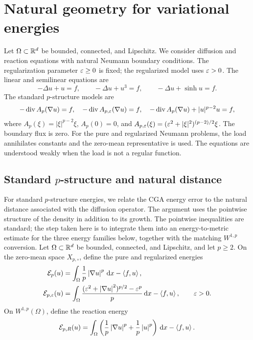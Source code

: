 \section{Natural geometry for variational energies}
\label{sec:pgeometry}

Let \(\Omega\subset\mathbb{R}^d\) be bounded, connected, and Lipschitz.
We consider diffusion and reaction equations with natural Neumann boundary conditions.
The regularization parameter \(\varepsilon\geq0\) is fixed; the regularized model uses \(\varepsilon>0\).
The linear and semilinear equations are
\[
-\Delta u+u=f,\qquad -\Delta u+u^3=f,\qquad -\Delta u+\sinh u=f.
\]
The standard \(p\)-structure models are
\[
-\operatorname{div}A_p(\nabla u)=f,\quad
-\operatorname{div}A_{p,\varepsilon}(\nabla u)=f,\quad
-\operatorname{div}A_p(\nabla u)+|u|^{p-2}u=f,
\]
where \(A_p(\xi)=|\xi|^{p-2}\xi\), \(A_p(0)=0\), and
\(A_{p,\varepsilon}(\xi)=(\varepsilon^2+|\xi|^2)^{(p-2)/2}\xi\).
The boundary flux is zero. For the pure and regularized Neumann problems, the load annihilates constants and the zero-mean representative is used.
The equations are understood weakly when the load is not a regular function.



\subsection{Standard \texorpdfstring{\(p\)}{p}-structure and natural distance}

For standard \(p\)-structure energies, we relate the CGA energy error to the natural distance
associated with the diffusion operator. The argument uses the pointwise structure of the density in
addition to its growth. The pointwise inequalities are standard; the step taken here is to integrate
them into an energy-to-metric estimate for the three energy families below, together with the
matching \(W^{1,p}\) conversion. Let \(\Omega\subset\mathbb{R}^d\) be bounded, connected, and Lipschitz, and
let \(p\geq2\). On the zero-mean space \(X_{p,\circ}\), define the pure and regularized energies
\begin{align}
 \mathcal{E}_p(u)&=\int_\Omega\frac1p\left\lvert \nabla u\right\rvert^p\,\mathrm{d} x-\left\langle f,u\right\rangle,
 \label{eq:pure-energy}\\
 \mathcal{E}_{p,\varepsilon}(u)&=\int_\Omega
 \frac{(\varepsilon^2+\left\lvert \nabla u\right\rvert^2)^{p/2}-\varepsilon^p}{p}\,\mathrm{d} x-\left\langle f,u\right\rangle,
 \qquad\varepsilon>0.
 \label{eq:reg-energy}
\end{align}
On \(W^{1,p}(\Omega)\), define the reaction energy
\begin{equation}
 \mathcal{E}_{p,R}(u)=\int_\Omega\left(\frac1p\left\lvert \nabla u\right\rvert^p+
 \frac1p\left\lvert u\right\rvert^p\right)\,\mathrm{d} x-\left\langle f,u\right\rangle.
 \label{eq:reaction-energy}
\end{equation}

